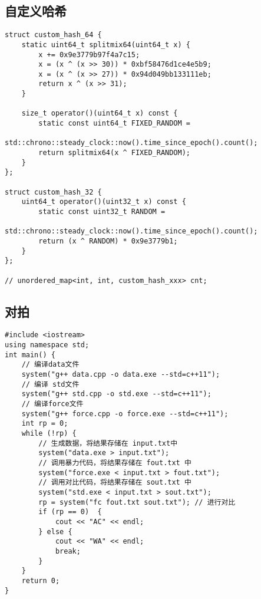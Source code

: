 \subsection{自定义哈希}
\begin{lstlisting}
struct custom_hash_64 {
    static uint64_t splitmix64(uint64_t x) {
        x += 0x9e3779b97f4a7c15;
        x = (x ^ (x >> 30)) * 0xbf58476d1ce4e5b9;
        x = (x ^ (x >> 27)) * 0x94d049bb133111eb;
        return x ^ (x >> 31);
    }

    size_t operator()(uint64_t x) const {
        static const uint64_t FIXED_RANDOM = 
            std::chrono::steady_clock::now().time_since_epoch().count();
        return splitmix64(x ^ FIXED_RANDOM);
    }
};

struct custom_hash_32 {
    uint64_t operator()(uint32_t x) const {
        static const uint32_t RANDOM = 
            std::chrono::steady_clock::now().time_since_epoch().count();
        return (x ^ RANDOM) * 0x9e3779b1;
    }
};

// unordered_map<int, int, custom_hash_xxx> cnt;
\end{lstlisting}

\subsection{对拍}
\begin{lstlisting}
#include <iostream>
using namespace std;
int main() {
    // 编译data文件
    system("g++ data.cpp -o data.exe --std=c++11");
    // 编译 std文件
    system("g++ std.cpp -o std.exe --std=c++11");
    // 编译force文件
    system("g++ force.cpp -o force.exe --std=c++11"); 
    int rp = 0;
    while (!rp) {
        // 生成数据，将结果存储在 input.txt中
        system("data.exe > input.txt");
        // 调用暴力代码，将结果存储在 fout.txt 中
        system("force.exe < input.txt > fout.txt");
        // 调用对比代码，将结果存储在 sout.txt 中
        system("std.exe < input.txt > sout.txt");
        rp = system("fc fout.txt sout.txt"); // 进行对比
        if (rp == 0)  {
            cout << "AC" << endl;
        } else {
            cout << "WA" << endl;
            break;
        }
    }
    return 0;
}
\end{lstlisting}